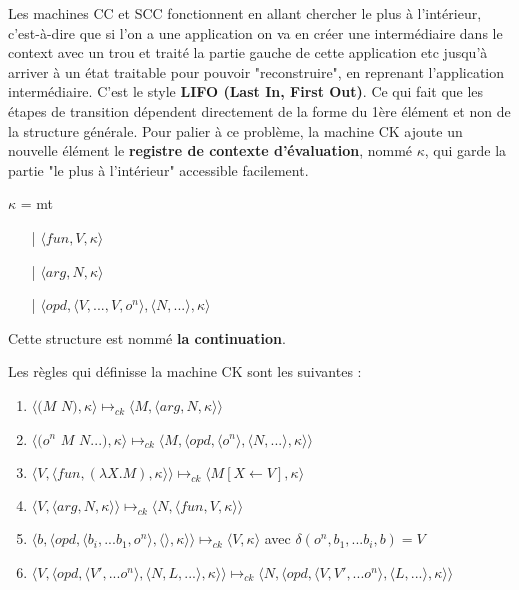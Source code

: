 \documentclass[10pt,a4paper]{article}
\begin{document}
			Les machines CC et SCC fonctionnent en allant chercher le plus à l'intérieur, c'est-à-dire que si l'on a une application on va en créer une intermédiaire dans le context avec un trou et traité la partie gauche de cette application etc jusqu'à arriver à un état traitable pour pouvoir "reconstruire", en reprenant l'application intermédiaire. C'est le style \textbf{ LIFO (Last In, First Out)}. Ce qui fait que les étapes de transition dépendent directement de la forme du 1ère élément et non de la structure générale.
			\smallbreak
			Pour palier à ce problème, la machine CK ajoute un nouvelle élément le \textbf{registre de contexte d'évaluation}, nommé $\kappa$, qui garde la partie "le plus à l'intérieur" accessible facilement.
			\smallbreak
			
			$\kappa$ = mt
			\begin{itemize}
				\item[|] $\langle fun,V,\kappa \rangle$
				\item[|] $\langle arg,N,\kappa \rangle$
				\item[|] $\langle opd,\langle V,...,V,o^{n}\rangle,\langle N,... \rangle,\kappa \rangle$
			\end{itemize}
			
			Cette structure est nommé \textbf{la continuation}.
			\medbreak
			
			Les règles qui définisse la machine CK sont les suivantes :
			\begin{enumerate}
				\item $\langle(M$ $N),\kappa\rangle \longmapsto_{ck} \langle M,\langle arg,N,\kappa\rangle\rangle$
				\item $\langle(o^{n}$ $M$ $N...),\kappa\rangle \longmapsto_{ck} \langle M,\langle opd,\langle o^{n}\rangle,\langle N,...\rangle,\kappa\rangle\rangle$
				\item $\langle V,\langle fun,(\lambda X.M),\kappa \rangle \rangle \longmapsto_{ck} \langle M[X \leftarrow V],\kappa\rangle$
				\item $\langle V,\langle arg,N,\kappa \rangle \rangle \longmapsto_{ck} \langle N,\langle fun,V,\kappa \rangle \rangle$
				\item $\langle b,\langle opd,\langle b_{i},...b_{1},o^{n}\rangle,\langle\rangle,\kappa\rangle\rangle \longmapsto_{ck} \langle V,\kappa\rangle$ avec $\delta(o^{n},b_{1},...b_{i},b) = V$
				\item $\langle V,\langle opd,\langle V',...o^{n}\rangle,\langle N,L,...\rangle,\kappa\rangle\rangle \longmapsto_{ck} \langle N,\langle opd,\langle V,V',...o^{n}\rangle,\langle L,...\rangle,\kappa\rangle\rangle$
			\end{enumerate}
			\bigbreak
			
\end{document}

